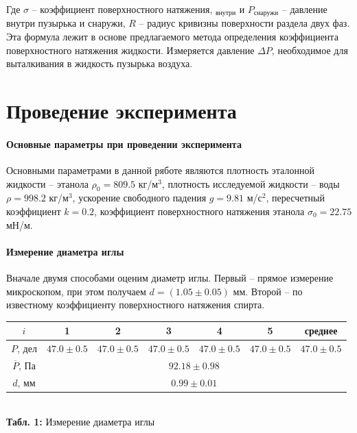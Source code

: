 \documentclass[12pt,a4paper]{scrartcl}
\begin{document}
	Где $\sigma$ -- коэффициент поверхностного натяжения, $_{\text{внутри}}$ и $P_{\text{снаружи}}$ -- давление внутри пузырька и снаружи, $R$ -- радиус кривизны поверхности раздела двух фаз. Эта формула лежит в основе предлагаемого метода определения коэффициента поверхностного натяжения жидкости. Измеряется давление $\Delta P$, необходимое для выталкивания в жидкость пузырька воздуха.

	\section{Проведение эксперимента}
	\paragraph{Основные параметры при проведении эксперимента} \hfill
	
	Основными параметрами в данной ряботе являются плотность эталонной жидкости -- этанола $\rho_0 = 809.5$ кг/м$^3$, плотность исследуемой жидкости -- воды $\rho = 998.2$ кг/м$^3$, ускорение свободного падения $g = 9.81$ м/с$^2$, пересчетный коэффициент $k = 0.2$, коэффициент поверхностного натяжения этанола $\sigma_0 = 22.75$ мН/м.
	
	\paragraph{Измерение диаметра иглы} \hfill
	
	Вначале двумя способами оценим диаметр иглы. Первый -- прямое измерение микроскопом, при этом получаем $d = (1.05 \pm 0.05)$ мм. Второй -- по известному коэффициенту поверхностного натяжения спирта.

	\begin{center}
		\begin{tabular}{|c|c|c|c|c|c|c|}
			\hline
			$i$ & 1 & 2 & 3 & 4 & 5 & среднее
			\\\hline
			$P$, дел & $47.0 \pm 0.5$ & $47.0 \pm 0.5$ & $47.0 \pm 0.5$ & $47.0 \pm 0.5$ & $47.0 \pm 0.5$ & $47.0 \pm 0.5$
			\\\hline
			$\overline{P}$, Па & \multicolumn{6}{|c|}{$92.18 \pm 0.98$}
			\\\hline
			$d$, мм & \multicolumn{6}{|c|}{$0.99 \pm 0.01$}
			\\\hline
		\end{tabular}
		\\\textbf{Табл. 1:} Измерение диаметра иглы
	\end{center}
\end{document}
